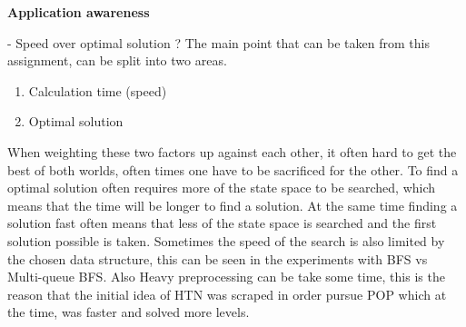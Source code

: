 \documentclass[Main]{subfiles}
\begin{document}
\textbf{Application awareness}

- Speed over optimal solution ?
The main point that can be taken from this assignment, can be split into two areas.
\begin{enumerate}
	\item Calculation time (speed)
	\item Optimal solution
\end{enumerate}
When weighting these two factors up against each other, it often hard to get the best of both worlds, often times one have to be sacrificed for the other. To find a optimal solution often requires more of the state space to be searched, which means that the time will be longer to find a solution. At the same time finding a solution fast often means that less of the state space is searched and the first solution possible is taken.
Sometimes the speed of the search is also limited by the chosen data structure, this can be seen in the experiments with BFS vs Multi-queue BFS. Also Heavy preprocessing can be take some time, this is the reason that the initial idea of HTN was scraped in order pursue POP which at the time, was faster and solved more levels.
\end{document}
